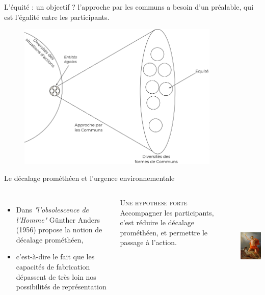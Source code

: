 \documentclass[newPxFont]{beamer}
\begin{document}
  \begin{frame}[c]{L'équité : un objectif ?}
    \vspace{-1cm}
    l'approche par les communs a besoin d'un préalable, qui est l'égalité entre les participants.
    \begin{figure}
      \includegraphics[height=7cm]{img/commun_egalite_equite.png}
    \end{figure}
  \end{frame}

  \begin{frame}[c]{Le décalage prométhéen et l'urgence environnementale}
    \vspace{-1cm}
    \begin{columns}[onlytextwidth,T]
      \column{\dimexpr\linewidth-30mm-5mm}
      \begin{itemize}
        \item Dans \textit{"l'obsolescence de l'Homme"} Günther Anders (1956) propose la notion de décalage prométhéen,
        \item c'est-à-dire le fait que les capacités de fabrication dépassent de très loin nos possibilités de représentation
      \end{itemize}

      \small{
        \begin{alertblock}{\textsc{Une hypothese forte}}
          Accompagner les participants, c'est réduire le décalage prométhéen, et permettre le passage à l'action.
        \end{alertblock}
      }
      \column{30mm}
      \includegraphics[height=5cm]{img/promethee.jpg}
    \end{columns}
  \end{frame}
\end{document}
